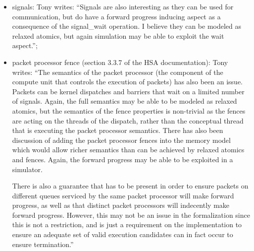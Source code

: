 \documentclass[a4paper]{article}
\begin{document}
{\begin{itemize}
\begin{itemize}
potentially multiple work-groups on a compute unit: Tony writes: ``Again, what
is currently defined is rather limited, and the feeling is that the guarantees
are not sufficient to write many useful algorithms. However, generalizing to
just plain independent forward progress of wavefronts (as is done in
traditional CPU operating systems) has the unattractive consequence for reduced
power efficiency due to spinning blocking the progress of producers  and
reduced performance due to cache thrashing as a consequence of a larger working
set. So we were interested in investigating if there were communication
primitives that could be introduced that would induce forward progress and
allow hardware implementations to exploit the knowledge to avoid some of the
performance issues of plain independent forward progress.'';
  \item signals: Tony writes: ``Signals are also interesting as they can be
used for communication, but do have a forward progress inducing aspect as a
consequence of the signal\_wait operation. I believe they can be modeled as
relaxed atomics, but again simulation may be able to exploit the wait aspect.'';
\item packet processor fence (section 3.3.7 of the HSA documentation): Tony
writes: ``The semantics of the packet processor (the component of the compute
unit that controls the execution of packets) has also been an issue. Packets
can be kernel dispatches and barriers that wait on a limited number of signals.
Again, the full semantics may be able to be modeled as relaxed atomics, but the
semantics of the fence properties is non-trivial as the fences are acting on
the threads of the dispatch, rather than the conceptual thread that is
executing the packet processor semantics.  There has also been discussion of
adding the packet processor fences into the memory model which would allow
richer semantics than can be achieved by relaxed atomics and fences. Again, the
forward progress may be able to be exploited in a simulator.

There is also a guarantee that has to be present in order to ensure packets on
different queues serviced by the same packet processor will make forward
progress, as well as that distinct packet processors will indecently make
forward progress. However, this may not be an issue in the formalization since
this is not a restriction, and is just a requirement on the implementation to
ensure an adequate set of valid execution candidates can in fact occur to
ensure termination.''
  \end{itemize} 


\end{itemize}}
\end{document}
